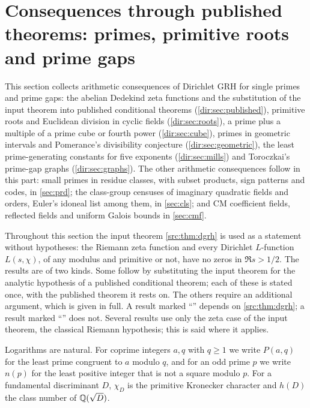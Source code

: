 \providecommand{\dirfiles}[1]{\par\smallskip\noindent
  {\footnotesize\raggedright\emph{Files:} #1.\par}\smallskip}
\providecommand{\dirP}{\mathbb{P}}
\providecommand{\dirE}{\mathbb{E}}
\providecommand{\dirU}{\mathrm{U}}

\section{Consequences through published theorems: primes, primitive roots and prime gaps}\label{sec:dir}

This section collects arithmetic consequences of Dirichlet GRH for single primes and prime gaps: the
abelian Dedekind zeta functions and the substitution of the input theorem into published conditional
theorems (\cref{dir:sec:published}), primitive roots and Euclidean division in cyclic fields
(\cref{dir:sec:roots}), a prime plus a multiple of a prime cube or fourth power (\cref{dir:sec:cube}), primes
in geometric intervals and Pomerance's divisibility conjecture (\cref{dir:sec:geometric}), the least
prime-generating constants for five exponents (\cref{dir:sec:mills}) and Toroczkai's prime-gap graphs
(\cref{dir:sec:graphs}). The other arithmetic consequences follow in this part: small primes in residue
classes, with subset products, sign patterns and codes, in \cref{sec:prd}; the class-group censuses of
imaginary quadratic fields and orders, Euler's idoneal list among them, in \cref{sec:cls}; and CM
coefficient fields, reflected fields and uniform Galois bounds in \cref{sec:cmf}.

Throughout this section the input theorem \cref{src:thm:dgrh} is used as a statement
without hypotheses: the Riemann zeta function and every Dirichlet $L$-function
$L(s,\chi)$, of any modulus and primitive or not, have no zeros in $\Re s>1/2$.
The results are of two kinds. Some follow by substituting the input theorem for the
analytic hypothesis of a published conditional theorem; each of these is stated once,
with the published theorem it rests on. The others require an additional argument,
which is given in full. A result marked ``\stG'' depends on \cref{src:thm:dgrh};
a result marked ``\stU'' does not. Several results use only the zeta case of the input
theorem, the classical Riemann hypothesis; this is said where it applies.

Logarithms are natural. For coprime integers $a,q$ with $q\ge1$ we write $P(a,q)$ for
the least prime congruent to $a$ modulo $q$, and for an odd prime $p$ we write $n(p)$
for the least positive integer that is not a square modulo $p$. For a fundamental
discriminant $D$, $\chi_D$ is the primitive Kronecker character and $h(D)$ the class
number of $\mathbb{Q}(\sqrt D)$.

